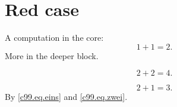 \chapter{Red case}\label{c99}

A computation in the core:
\begin{equation}\label{c99.eq.eins}
  1 + 1 = 2.
\end{equation}
More in the deeper block.

\begin{vertiefung}[id=c99.v1, titel={Deeper}, wozu={Shows a second computation.},
    voraussetzung={Equation~\eqref{c99.eq.eins}.}]
  \begin{equation}\label{c99.eq.tief}
    2 + 2 = 4.
  \end{equation}
\end{vertiefung}

\begin{equation}\label{c99.eq.zwei}
  2 + 1 = 3.
\end{equation}
By \eqref{c99.eq.eins} and \eqref{c99.eq.zwei}.
